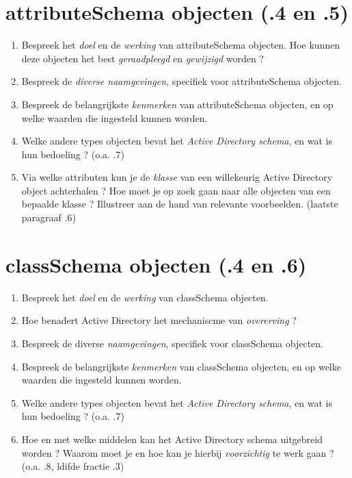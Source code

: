 \documentclass{report}
\begin{document}
	\section{attributeSchema objecten {\color{red} (.4 en .5)}}
	\begin{enumerate}
		\item Bespreek het \textit{doel} en de \textit{werking} van attributeSchema objecten. Hoe kunnen deze objecten het best \textit{geraadpleegd} en \textit{gewijzigd} worden ?
		
		\item Bespreek de \textit{diverse naamgevingen}, specifiek voor attributeSchema objecten.
		
		\item Bespreek de belangrijkste \textit{kenmerken} van attributeSchema objecten, en op welke waarden die ingesteld kunnen worden.
		
		\item Welke andere types objecten bevat het \textit{Active Directory schema}, en wat is hun bedoeling ? {\color{red} (o.a. .7)}
		
		\item Via welke attributen kun je de \textit{klasse} van een willekeurig Active Directory object achterhalen ? Hoe moet je op zoek gaan naar alle objecten van een bepaalde klasse ? Illustreer aan de hand van relevante voorbeelden. {\color{red} (laatste paragraaf .6)}
	\end{enumerate}

	\section{classSchema objecten {\color{red} (.4 en .6)}}
	\begin{enumerate}
		\item Bespreek het \textit{doel} en de \textit{werking} van classSchema objecten.
		
		\item Hoe benadert Active Directory het mechaniscme van \textit{overerving} ?
		
		\item Bespreek de diverse \textit{naamgevingen}, specifiek voor classSchema objecten.
		
		\item Bespreek de belangrijkste \textit{kenmerken} van classSchema objecten, en op welke waarden die ingesteld kunnen worden.
		
		\item Welke andere types objecten bevat het \textit{Active Directory schema}, en wat is hun bedoeling ? {\color{red} (o.a. .7)}
		
		\item Hoe en met welke middelen kan het Active Directory schema uitgebreid worden ? Waarom moet je en hoe kan je hierbij \textit{voorzichtig} te werk gaan ? {\color{red} (o.a. .8, ldifde fractie .3)}
	\end{enumerate}
\end{document}
